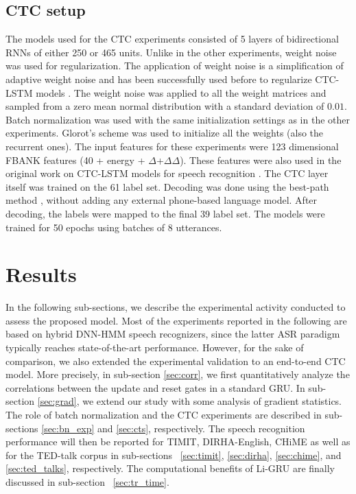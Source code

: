 \documentclass[journal]{IEEEtran}
\begin{document}
\subsection{CTC setup} \label{sec:ctc_setup}
The models used for the CTC experiments consisted of 5 layers of bidirectional RNNs of either 250 or 465 units. Unlike in the other experiments, weight noise was used for regularization. The application of weight noise is a simplification of adaptive weight noise \cite{graves2011practical} and has been successfully used before to regularize CTC-LSTM models \cite{graves2013speech}. The weight noise was applied to all the weight matrices and sampled from a zero mean normal distribution with a standard deviation of $0.01$. Batch normalization was used with the same initialization settings as in the other experiments. Glorot's scheme was used to initialize all the weights (also the recurrent ones). The input features for these experiments were 123 dimensional FBANK features (40 + energy + $\Delta$+$\Delta\Delta$). These features were also used in the original work on CTC-LSTM models for speech recognition \cite{graves2013speech}.
The CTC layer itself was trained on the 61 label set. Decoding was done using the best-path method \cite{CTC_graves}, without adding any external phone-based language model.
After decoding, the labels were mapped to the final 39 label set. The models were trained for 50 epochs using batches of 8 utterances. 



\section{Results} \label{sec:res}
In the following sub-sections, we describe the experimental activity conducted to assess the proposed model. Most of the experiments reported in the following are based on hybrid DNN-HMM speech recognizers, since the latter ASR paradigm typically reaches state-of-the-art performance. However, for the sake of comparison, we also extended the experimental validation to an end-to-end CTC model.
More precisely, in sub-section \ref{sec:corr}, we first  quantitatively analyze the correlations between the update and reset gates in a standard GRU. In sub-section \ref{sec:grad}, we extend our study with some analysis of gradient statistics. The role of batch normalization and the CTC experiments are described in sub-sections \ref{sec:bn_exp} and \ref{sec:cts}, respectively. The speech recognition performance will then be reported for TIMIT,  DIRHA-English, CHiME as well as for the TED-talk corpus in  sub-sections ~\ref{sec:timit}, \ref{sec:dirha}, \ref{sec:chime}, and \ref{sec:ted_talks}, respectively. The computational benefits of Li-GRU are finally discussed in sub-section ~\ref{sec:tr_time}. 
\end{document}
